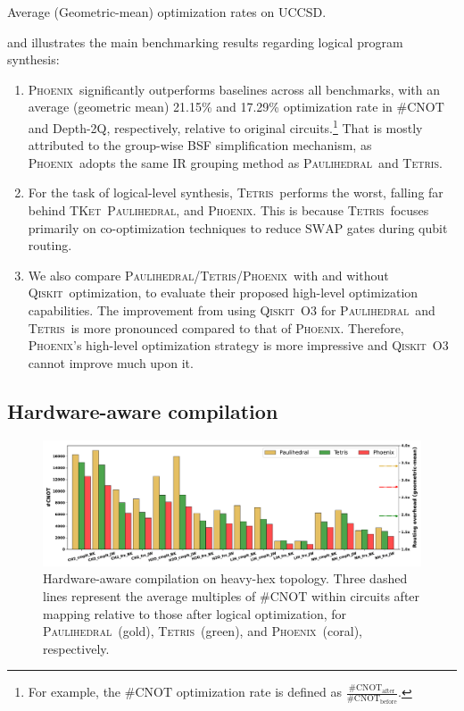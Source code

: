 \documentclass[conference,9pt]{IEEEtran}
\newcommand{\phoenix}{\textsc{Phoenix}}
\newcommand{\qiskit}{\textsc{Qiskit}}
\newcommand{\tket}{\textsc{TKet}}
\newcommand{\tetris}{\textsc{Tetris}}
\newcommand{\paulihedral}{\textsc{Paulihedral}}
\newcommand{\SWAP}{\mathrm{SWAP}}
\newcommand{\CNOT}{\mathrm{CNOT}}
\begin{document}
    \begin{table}[tbp]
        \centering
        \caption{Average (Geometric-mean) optimization rates on UCCSD.}
        \scalebox{0.95}{
                        
        }
        \label{tab:uccsd-avg}        
    \end{table}

     and  illustrates the main benchmarking results regarding logical program synthesis:
    \begin{enumerate}
        \item \phoenix\ significantly outperforms baselines across all benchmarks, with an average (geometric mean) 21.15\% and 17.29\% optimization rate in \#$ \CNOT $ and Depth-2Q, respectively, relative to original circuits.\footnote{For example, the \#$ \CNOT $ optimization rate is defined as $\frac{\#\CNOT_\textrm{after}}{\#\CNOT_\textrm{before}}$.} That is mostly attributed to the group-wise BSF simplification mechanism, as \phoenix\ adopts the same IR grouping method as \paulihedral\ and \tetris.
        \item For the task of logical-level synthesis, \tetris\ performs the worst, falling far behind \tket\, \paulihedral, and \phoenix. This is because \tetris\ focuses primarily on co-optimization techniques to reduce $\SWAP$ gates during qubit routing.
        \item We also compare \paulihedral/\tetris/\phoenix\ with and without \qiskit\ optimization, to evaluate their proposed high-level optimization capabilities. The improvement from using \qiskit\ O3 for \paulihedral\ and \tetris\ is more pronounced compared to that of \phoenix. Therefore, \phoenix's high-level optimization strategy is more impressive and \qiskit\ O3 cannot improve much upon it.
    \end{enumerate}


\subsection{Hardware-aware compilation}

    \begin{figure}[tbp]
        \centering
        \includegraphics[width=\columnwidth]{figures/num_2q_gates_manhattan.pdf}
        \caption{Hardware-aware compilation on heavy-hex topology. Three dashed lines represent the average multiples of \#$\CNOT$ within circuits after mapping relative to those after logical optimization, for \paulihedral\ (gold), \tetris\ (green), and \phoenix\ (coral), respectively.}
        \label{fig:manhattan}
    \end{figure}
\end{document}
